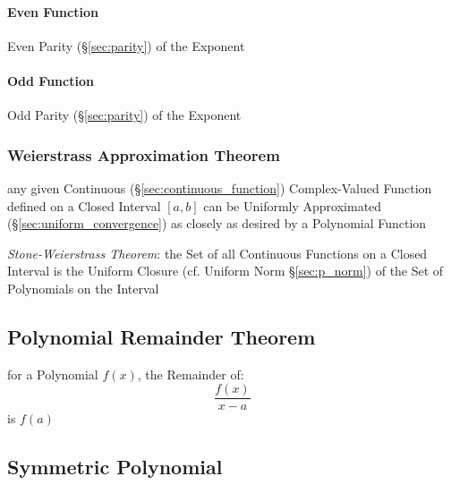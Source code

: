 \paragraph{Even Function}\label{sec:even_function}\hfill

Even Parity (\S\ref{sec:parity}) of the Exponent



\paragraph{Odd Function}\label{sec:odd_function}\hfill

Odd Parity (\S\ref{sec:parity}) of the Exponent



\subsubsection{Weierstrass Approximation Theorem}
\label{sec:weierstrass_approximation}

any given Continuous (\S\ref{sec:continuous_function}) Complex-Valued Function
defined on a Closed Interval $[a,b]$ can be Uniformly Approximated
(\S\ref{sec:uniform_convergence}) as closely as desired by a Polynomial Function

\emph{Stone-Weierstrass Theorem}: the Set of all Continuous Functions on a
Closed Interval is the Uniform Closure (cf. Uniform Norm \S\ref{sec:p_norm}) of
the Set of Polynomials on the Interval



\subsection{Polynomial Remainder Theorem}\label{sec:polynomial_remainder}

for a Polynomial $f(x)$, the Remainder of:
\[
  \frac{f(x)}{x - a}
\]
is $f(a)$



\subsection{Symmetric Polynomial}\label{sec:symmetric_polynomial}

